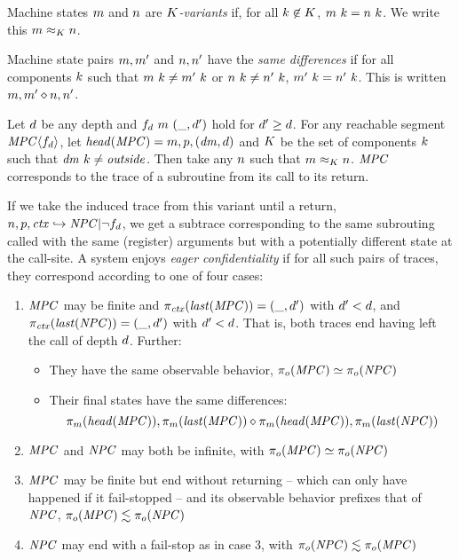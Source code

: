 \documentclass[acmsmall,review,anonymous]{acmart}\settopmatter{printfolios=true,printccs=false,printacmref=false}
\begin{document}
 Machine states \(m\) and \(n\) are {\em \(K\)-variants} if, for
all \(k \not \in K\), \(m ~ k = n ~ k\). We write
this \(m \approx_K n\).

 Machine state pairs \(m,m'\) and \(n,n'\) have the {\em same differences}
if for all components \(k\) such that \(m ~ k \not = m' ~ k\) or
\(n ~ k \not = n' ~ k\), \(m' ~ k = n' ~ k\).
This is written \(m,m' \diamond n,n'\).

 Let \(d\) be any depth and \(f_d ~ m ~ (\_, d')\) hold for
\(d' \geq d\). For any reachable segment \(\mathit{MPC} \langle f_d \rangle\),
let \(\mathit{head}(\mathit{MPC}) = m,p,(\mathit{dm},d)\) and
\(K\) be the set of components \(k\) such that \(\mathit{dm} ~ k \not = \mathit{outside}\).
Then take any \(n\) such that \(m \approx_K n\). \(\mathit{MPC}\) corresponds to the
trace of a subroutine from its call to its return.

If we take the induced trace from this variant until a return,
\(n,p,\mathit{ctx} \hookrightarrow \mathit{NPC} | \neg f_d\), we get a subtrace corresponding
to the same subrouting called with the same (register) arguments but with a potentially different
state at the call-site. A system enjoys {\em eager confidentiality} if for all such pairs of traces,
they correspond according to one of four cases:

\begin{enumerate}
\item \(\mathit{MPC}\) may be finite and \(\pi_{\mathit{ctx}}(\mathit{last}(\mathit{MPC})) = (\_,d')\) with \(d' < d\),
  and \(\pi_{\mathit{ctx}}(\mathit{last}(\mathit{NPC})) = (\_,d')\) with \(d' < d\). That is, both traces end
  having left the call of depth \(d\). Further:
  \begin{itemize}
  \item They have the same observable behavior, \(\pi_o(\mathit{MPC}) \simeq \pi_o(\mathit{NPC})\)
  \item Their final states have the same differences:
    \[\pi_m(\mathit{head}(\mathit{MPC})), \pi_m(\mathit{last}(\mathit{MPC})) \diamond
    \pi_m(\mathit{head}(\mathit{MPC})), \pi_m(\mathit{last}(\mathit{NPC}))\]
  \end{itemize}
\item \(\mathit{MPC}\) and \(\mathit{NPC}\) may both be infinite, with \(\pi_o(\mathit{MPC}) \simeq \pi_o(\mathit{NPC})\)
\item \(\mathit{MPC}\) may be finite but end without returning -- which can only have happened if it fail-stopped --
  and its observable behavior prefixes that of \(\mathit{NPC}\), \(\pi_o(\mathit{MPC}) \lesssim \pi_o(\mathit{NPC})\)
\item \(\mathit{NPC}\) may end with a fail-stop as in case 3, with \(\pi_o(\mathit{NPC}) \lesssim \pi_o(\mathit{MPC})\)
\end{enumerate}
\end{document}
